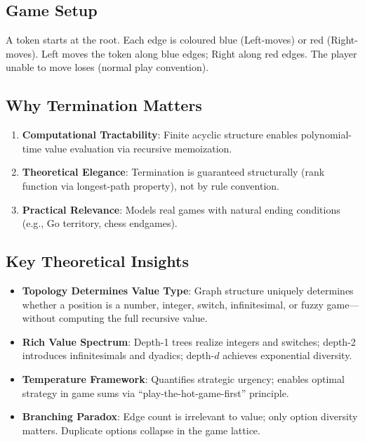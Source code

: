 \documentclass[10pt,a4paper,twocolumn]{article}
\theoremstyle{plain}
\theoremstyle{definition}
\theoremstyle{remark}
\begin{document}
\subsection{Game Setup}

A token starts at the root. Each edge is coloured blue (Left-moves) or red (Right-moves). Left moves the token along blue edges; Right along red edges. The player unable to move loses (normal play convention).

\subsection{Why Termination Matters}

\begin{enumerate}
\item \textbf{Computational Tractability}: Finite acyclic structure enables polynomial-time value evaluation via recursive memoization.
\item \textbf{Theoretical Elegance}: Termination is guaranteed structurally (rank function via longest-path property), not by rule convention.
\item \textbf{Practical Relevance}: Models real games with natural ending conditions (e.g., Go territory, chess endgames).
\end{enumerate}

\subsection{Key Theoretical Insights}

\begin{itemize}
\item \textbf{Topology Determines Value Type}: Graph structure uniquely determines whether a position is a number, integer, switch, infinitesimal, or fuzzy game—without computing the full recursive value.
\item \textbf{Rich Value Spectrum}: Depth-1 trees realize integers and switches; depth-2 introduces infinitesimals and dyadics; depth-$d$ achieves exponential diversity.
\item \textbf{Temperature Framework}: Quantifies strategic urgency; enables optimal strategy in game sums via ``play-the-hot-game-first'' principle.
\item \textbf{Branching Paradox}: Edge count is irrelevant to value; only option diversity matters. Duplicate options collapse in the game lattice.
\end{itemize}
\end{document}

